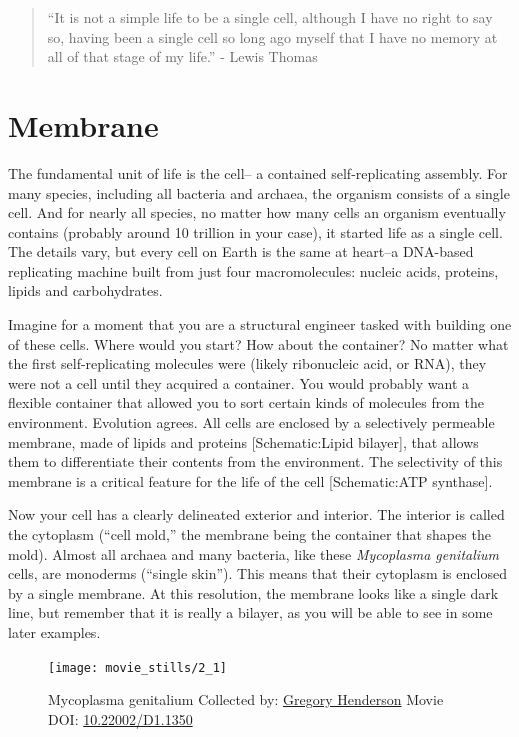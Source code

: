 \documentclass[]{tufte-book}
\begin{document}
\begin{quote}
``It is not a simple life to be a single cell, although I have no right
to say so, having been a single cell so long ago myself that I have no
memory at all of that stage of my life.'' - Lewis Thomas
\citep{thomas1990}
\end{quote}

\section{Membrane}\label{membrane}

The fundamental unit of life is the cell-- a contained self-replicating
assembly. For many species, including all bacteria and archaea, the
organism consists of a single cell. And for nearly all species, no
matter how many cells an organism eventually contains (probably around
10 trillion in your case), it started life as a single cell. The details
vary, but every cell on Earth is the same at heart--a DNA-based
replicating machine built from just four macromolecules: nucleic acids,
proteins, lipids and carbohydrates.

Imagine for a moment that you are a structural engineer tasked with
building one of these cells. Where would you start? How about the
container? No matter what the first self-replicating molecules were
(likely ribonucleic acid, or RNA), they were not a cell until they
acquired a container. You would probably want a flexible container that
allowed you to sort certain kinds of molecules from the environment.
Evolution agrees. All cells are enclosed by a selectively permeable
membrane, made of lipids and proteins {[}Schematic:Lipid bilayer{]},
that allows them to differentiate their contents from the environment.
The selectivity of this membrane is a critical feature for the life of
the cell {[}Schematic:ATP synthase{]}.

Now your cell has a clearly delineated exterior and interior. The
interior is called the cytoplasm (``cell mold,'' the membrane being the
container that shapes the mold). Almost all archaea and many bacteria,
like these \emph{Mycoplasma genitalium} cells, are monoderms (``single
skin''). This means that their cytoplasm is enclosed by a single
membrane. At this resolution, the membrane looks like a single dark
line, but remember that it is really a bilayer, as you will be able to
see in some later examples.





\begin{figure}
\texttt{[image: movie\_stills/2\_1]} \caption[Mycoplasma genitalium Collected by:
\protect\hyperlink{gregory_henderson}{Gregory Henderson} Movie DOI:
\href{https://doi.org/10.22002/D1.1350}{10.22002/D1.1350}]{Mycoplasma genitalium Collected by:
\protect\hyperlink{gregory_henderson}{Gregory Henderson} Movie DOI:
\href{https://doi.org/10.22002/D1.1350}{10.22002/D1.1350}}\label{fig:2-1}
\end{figure}
\end{document}
